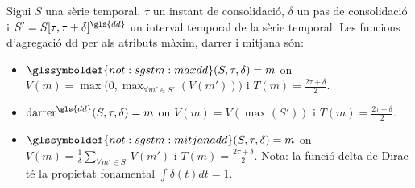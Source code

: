 \begin{definition}
  \label{def:sgstm:maxdd}
  Sigui $S$ una sèrie temporal, $\tau$ un instant de consolidació,
  $\delta$ un pas de consolidació i $S'=S[\tau,\tau+\delta]^{\gls{dd}}$ un
  interval temporal de la sèrie temporal. 
  Les funcions d'agregació \gls{dd} per als
  atributs màxim, darrer i mitjana són:
\begin{itemize}
\item $\glssymboldef{not:sgstm:maxdd}(S,\tau,\delta)=m$ on $V(m) =
  \max\big(0,\max_{\forall m' \in S'}(V(m'))\big)$ i
  $T(m)=\frac{2\tau+\delta}{2}$.

\item $\operatorname{darrer}^{\gls{dd}}(S,\tau,\delta)=m$ on $V(m) =
  V(\max(S'))$ i $T(m)=\frac{2\tau+\delta}{2}$.

\item $\glssymboldef{not:sgstm:mitjanadd}(S,\tau,\delta)=m$ on
  $V(m) = \frac{1}{\delta}\sum\limits_{\forall m' \in S'} V(m')$ i
  $T(m)=\frac{2\tau+\delta}{2}$. Nota: la funció delta de Dirac té la
  propietat fonamental $\int \delta(t)dt = 1$. 
\end{itemize}
\end{definition}



